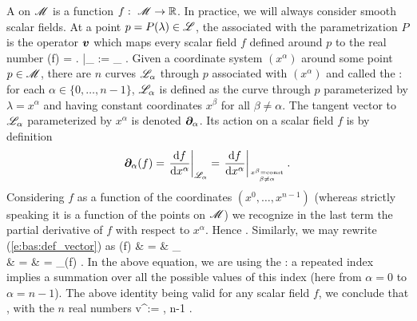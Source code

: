 A  on $\mathscr{M}$ is a function
$f:\ \mathscr{M} \rightarrow \mathbb{R}$. In practice, we will always consider smooth scalar fields. At a point $p=P(\lambda)\in\mathscr{L}$, the  associated with the parametrization
$P$ is the operator $\bm{v}$ which maps every scalar field $f$ defined around
$p$ to the real number
\be \label{e:bas:def_vector}
  (f) = \left.  \right|_{\Li} :=
  \lim_{\varepsilon{}} 
   .
\ee
Given a coordinate system $(x^\alpha)$ around some point $p\in\mathscr{M}$, there are
$n$ curves $\mathscr{L}_\alpha$ through $p$ associated with $(x^\alpha)$ and called the
:
for each $\alpha\in\{0,\ldots,n-1\}$, $\mathscr{L}_\alpha$ is defined as the curve through $p$ parameterized by $\lambda = x^\alpha$ and having constant coordinates
$x^\beta$ for all $\beta\not=\alpha$.
The tangent vector to $\mathscr{L}_\alpha$ parameterized by $x^\alpha$ is
denoted $\bm{\partial}_\alpha$. Its action on a scalar field $f$ is by definition
\[
  \bm{\partial}_\alpha(f) =
  \left. \frac{\mathrm{d} f}{\mathrm{d} x^\alpha} \right|_{\mathscr{L}_\alpha}
  = \left. \frac{\mathrm{d} f}{\mathrm{d} x^\alpha} \right|_{x^\beta={\rm const}\atop \beta\not=\alpha} .
\]
Considering $f$ as a function of
the coordinates $(x^0,\ldots,x^{n-1})$ (whereas strictly speaking it is a function
of the points on $\mathscr{M}$) we recognize in the last term the partial derivative of
$f$ with respect to $x^\alpha$. Hence
\be \label{e:bas:wpar_partial}
  .
\ee
Similarly, we may rewrite (\ref{e:bas:def_vector}) as
\bea
  (f) & = & \lim_{\varepsilon{}} 
   \nonumber \\
  & = &  
  = \wpar_\alpha(f)  . \nonumber
\eea
In the above equation,
we are using the : a repeated index implies a summation over all the possible values of this index
(here from $\alpha=0$ to $\alpha=n-1$).
The above identity being valid for any scalar field $f$, we conclude that
\be \label{e:bas:v_va_wpar_a}
   ,
\ee
with the $n$ real numbers
\be \label{e:bas:va_dXadlamb}
  v^\alpha :=  ,  \leq \alpha\leq n-1 .
